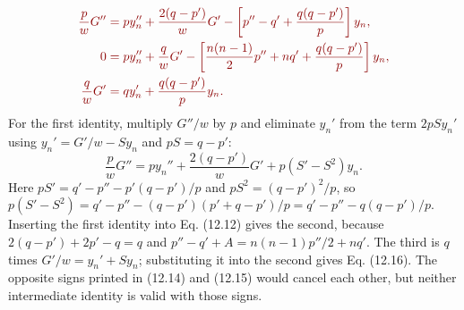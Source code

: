 \begin{align*}
\erratum{\frac p wG''}
&\erratum{{}=p y_n''+\frac{2(q-p')}{w}G'
 -\left[p''-q'+\frac{q(q-p')}{p}\right]y_n,}\\
\erratum{0}
&\erratum{{}=p y_n''+\frac q wG'
 -\left[\frac{n(n-1)}2p''+nq'+\frac{q(q-p')}{p}\right]y_n,}\\
\erratum{\frac q wG'}
&\erratum{{}=q y_n'+\frac{q(q-p')}{p}y_n.}
\end{align*}
For the first identity, multiply $G''/w$ by $p$ and eliminate $y_n'$
from the term $2pSy_n'$ using $y_n'=G'/w-Sy_n$ and $pS=q-p'$:
\[
\frac pwG''=py_n''+\frac{2(q-p')}{w}G'+p(S'-S^2)y_n.
\]
Here $pS'=q'-p''-p'(q-p')/p$ and $pS^2=(q-p')^2/p$, so
$p(S'-S^2)=q'-p''-(q-p')(p'+q-p')/p=q'-p''-q(q-p')/p$.
Inserting the first identity into Eq. (12.12) gives the second, because
$2(q-p')+2p'-q=q$ and $p''-q'+A=n(n-1)p''/2+nq'$. The third is $q$
times $G'/w=y_n'+Sy_n$; substituting it into the second gives
Eq. (12.16).
The opposite signs printed in (12.14) and (12.15) would cancel each
other, but neither intermediate identity is valid with those signs.

